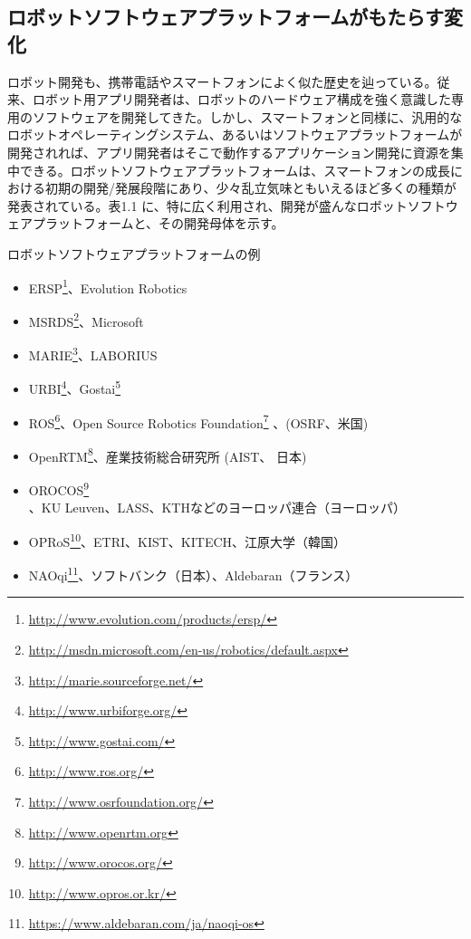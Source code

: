 \subsection{ロボットソフトウェアプラットフォームがもたらす変化}

ロボット開発も、携帯電話やスマートフォンによく似た歴史を辿っている。従来、ロボット用アプリ開発者は、ロボットのハードウェア構成を強く意識した専用のソフトウェアを開発してきた。しかし、スマートフォンと同様に、汎用的なロボットオペレーティングシステム、あるいはソフトウェアプラットフォームが開発されれば、アプリ開発者はそこで動作するアプリケーション開発に資源を集中できる。ロボットソフトウェアプラットフォームは、スマートフォンの成長における初期の開発/発展段階にあり、少々乱立気味ともいえるほど多くの種類が発表されている。表1.1 に、特に広く利用され、開発が盛んなロボットソフトウェアプラットフォームと、その開発母体を示す。

ロボットソフトウェアプラットフォームの例

\begin{itemize}
\item ERSP\footnote{\url{http://www.evolution.com/products/ersp/}}、Evolution Robotics
\item MSRDS\footnote{\url{http://msdn.microsoft.com/en-us/robotics/default.aspx}}、Microsoft
\item MARIE\footnote{\url{http://marie.sourceforge.net/}}、LABORIUS
\item URBI\footnote{\url{http://www.urbiforge.org/}}、Gostai\footnote{\url{http://www.gostai.com/}}
\item ROS\footnote{\url{http://www.ros.org/}}、Open Source Robotics Foundation\footnote{\url{http://www.osrfoundation.org/}} 、(OSRF、米国)
\item OpenRTM\footnote{\url{http://www.openrtm.org}}、産業技術総合研究所 (AIST、 日本)
\item OROCOS\footnote{\url{http://www.orocos.org/}}、KU Leuven、LASS、KTHなどのヨーロッパ連合（ヨーロッパ）
\item OPRoS\footnote{\url{http://www.opros.or.kr/}}、ETRI、KIST、KITECH、江原大学（韓国）
\item NAOqi\footnote{\url{https://www.aldebaran.com/ja/naoqi-os}}、ソフトバンク（日本）、Aldebaran（フランス）
\end{itemize}

